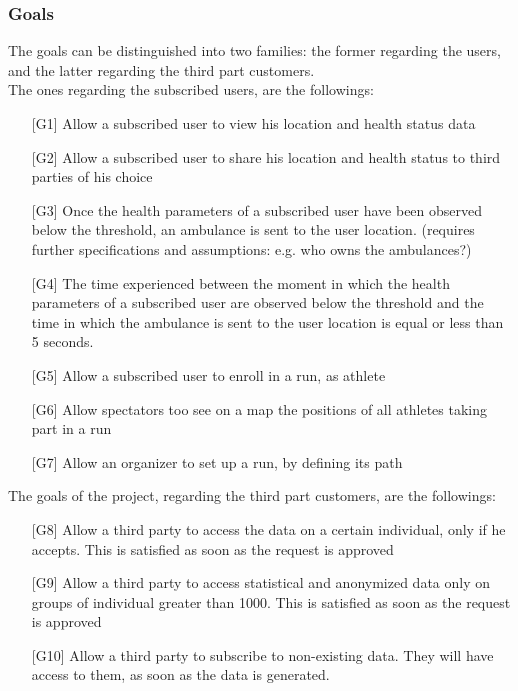 \subsubsection{Goals}
The goals can be distinguished into two families: the former regarding the users, and the latter regarding the third part customers.\\
The ones regarding the subscribed users, are the followings:
\begin{enumerate}
\item[{[G1]}] Allow a subscribed user to view his location and health status data 
\item[{[G2]}] Allow a subscribed user to share his location and health status to third parties of his choice
\item[{[G3]}] Once the health parameters of a subscribed user have been observed 
below the threshold, an ambulance is sent to the user location. (requires further specifications and assumptions: e.g. who owns the ambulances?)
\item[{[G4]}] The time experienced between the moment in which the health parameters of a subscribed user are observed below the threshold and the time in which the ambulance is sent to the user location is equal or less than 5 seconds. 
\item[{[G5]}] Allow a subscribed user to enroll in a run, as athlete
\item[{[G6]}] Allow spectators too see on a map the positions of all athletes taking part in a run
\item[{[G7]}] Allow an organizer to set up a run, by defining its path
\end{enumerate}
The goals of the project, regarding the third part customers, are the followings:
\begin{enumerate}
\item[{[G8]}] Allow a third party to access the data on a certain individual, only if he accepts. This is satisfied as soon as the request is approved
\item[{[G9]}] Allow a third party to access statistical and anonymized data only on groups of individual greater than 1000. This is satisfied as soon as the request is approved
\item[{[G10]}] Allow a third party to subscribe to non-existing data. They will have access to them, as soon as the data is generated. 
\end{enumerate}